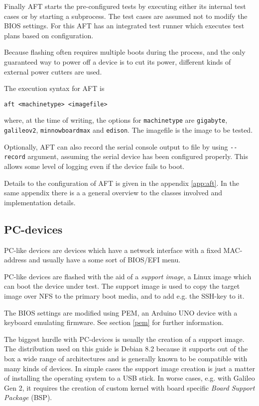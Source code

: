 \documentclass[a4paper,11pt]{article}
\newcommand{\cmd}[1]{\texttt{#1}}
\begin{document}
Finally AFT starts the pre-configured tests by executing either its internal test cases or by starting a subprocess. The test cases are assumed not to modify the BIOS settings. For this AFT has an integrated test runner which executes test plans based on configuration.

Because flashing often requires multiple boots during the process, and the only guaranteed way to power off a device is to cut its power, different kinds of external power cutters are used.

The execution syntax for AFT is
\begin{lstlisting}
aft <machinetype> <imagefile>
\end{lstlisting}
where, at the time of writing, the options for  \cmd{machinetype} are \cmd{gigabyte}, \cmd{galileov2}, \cmd{minnowboardmax} and \cmd{edison}. The imagefile is the image to be tested.

Optionally, AFT can also record the serial console output to file by using \cmd{-\/-record} argument, assuming the serial device has been configured properly. This allows some level of logging even if the device fails to boot.

Details to the configuration of AFT is given in the appendix \ref{app:aft}. In the same appendix there is a a general overview to the classes involved and implementation details.

\subsection{PC-devices}
\label{pc}
PC-like devices are devices which have a network interface with a fixed MAC-address and usually have a some sort of BIOS/EFI menu.

PC-like devices are flashed with the aid of a \textit{support image}, a Linux image which can boot the device under test. The support image is used to copy the target image over NFS to the primary boot media, and to add e.g. the SSH-key to it.

The BIOS settings are modified using PEM, an Arduino UNO device with a keyboard emulating firmware. See section \ref{pem} for further information.

The biggest hurdle with PC-devices is usually the creation of a support image. The distribution used on this guide is Debian 8.2 because it supports out of the box a wide range of architectures and is generally known to be compatible with many kinds of devices. In simple cases the support image creation is just a matter of installing the operating system to a USB stick. In worse cases, e.g. with Galileo Gen 2, it requires the creation of custom kernel with board specific \textit{Board Support Package} (BSP).
\end{document}
